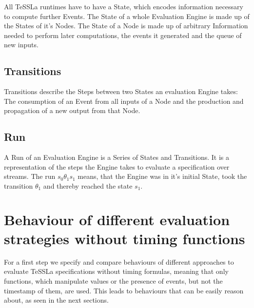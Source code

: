 All TeSSLa runtimes have to have a State, which encodes information necessary to compute further Events.
The State of a whole Evaluation Engine is made up of the States of it's Nodes.
The State of a Node is made up of arbitrary Information needed to perform later computations, the events it generated and the queue of new inputs.

\subsection{Transitions}
\label{sec:concepts:def:transitions}

Transitions describe the Steps between two States an evaluation Engine takes: The consumption of an Event from all inputs of a Node and the production and propagation of a new output from that Node.

\subsection{Run}
\label{sec:concepts:def:run}

A Run of an Evaluation Engine is a Series of States and Transitions.
It is a representation of the steps the Engine takes to evaluate a specification over streams.
The run \(s_0\theta_1s_1\) means, that the Engine was in it's initial State, took the transition \(\theta_1\) and thereby reached the state \(s_1\).




\section{Behaviour of different evaluation strategies without timing functions}
\label{sec:concepts:behaviour_without_timing}

For a first step we specify and compare behaviours of different approaches to evaluate TeSSLa specifications without timing formulas,
meaning that only functions, which manipulate values or the presence of events, but not the timestamp of them, are used.
This leads to behaviours that can be easily reason about, as seen in the next sections.

